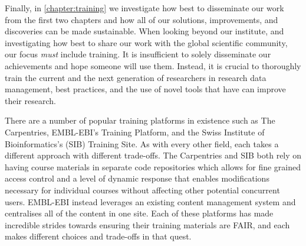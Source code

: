 Finally, in \cref{chapter:training} we investigate how best to disseminate our work from the first two chapters and how all of our solutions, improvements, and discoveries can be made sustainable. When looking beyond our institute, and investigating how best to share our work with the global scientific community, our focus \emph{must} include training. It is insufficient to solely disseminate our achievements and hope someone will use them. Instead, it is crucial to thoroughly train the current and the next generation of researchers in research data management, best practices, and the use of novel tools that have can improve their research.

There are a number of popular training platforms in existence such as The Carpentries\cite{Wilson_2006}, EMBL-EBI's Training Platform\cite{Cook_2018,Swan_2024}, and the Swiss Institute of Bioinformatics's (SIB) Training Site\cite{2015}. As with every other field, each takes a different approach with different trade-offs. The Carpentries and SIB both rely on having course materials in separate code repositories which allows for fine grained access control and a level of dynamic response that enables modifications necessary for individual courses without affecting other potential concurrent users. EMBL-EBI instead leverages an existing content management system and centralises all of the content in one site. Each of these platforms has made incredible strides towards ensuring their training materials are FAIR\cite{Garcia_2020}, and each makes different choices and trade-offs in that quest.

